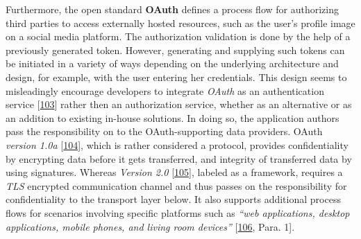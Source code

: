 \documentclass[12pt,english,a4paper,titlepage,cleardoublepage=empty,dottedtoc]{report}
\begin{document}
Furthermore, the open standard
\textbf{\protect\hypertarget{def--oauth}{}{OAuth}} defines a process
flow for authorizing third parties to access externally hosted
resources, such as the user's profile image on a social media platform.
The authorization validation is done by the help of a previously
generated token. However, generating and supplying such tokens can be
initiated in a variety of ways depending on the underlying architecture
and design, for example, with the user entering her credentials. This
design seems to misleadingly encourage developers to integrate
\emph{OAuth} as an authentication service
{[}\protect\hyperlink{ref-web_2012_problem-with-oauth-for-authentication}{103}{]}
rather then an authorization service, whether as an alternative or as an
addition to existing in-house solutions. In doing so, the application
authors pass the responsibility on to the OAuth-supporting data
providers. OAuth \emph{version 1.0a}
{[}\protect\hyperlink{ref-web_spec_oauth-1a}{104}{]}, which is rather
considered a protocol, provides confidentiality by encrypting data
before it gets transferred, and integrity of transferred data by using
signatures. Whereas \emph{Version 2.0}
{[}\protect\hyperlink{ref-web_spec_oauth-2}{105}{]}, labeled as a
framework, requires a \emph{TLS} encrypted communication channel and
thus passes on the responsibility for confidentiality to the transport
layer below. It also supports additional process flows for scenarios
involving specific platforms such as \emph{``web applications, desktop
applications, mobile phones, and living room devices''}
{[}\protect\hyperlink{ref-web_2016_oauth-2}{106}, Para. 1{]}.
\end{document}
